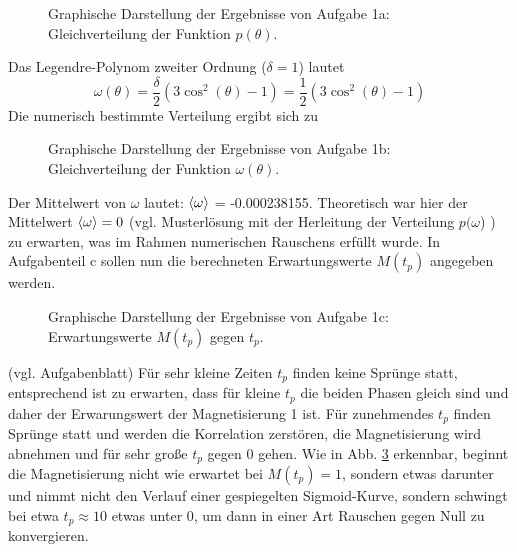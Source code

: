 \begin{landscape}
	\begin{figure}
		\caption{Graphische Darstellung der Ergebnisse von Aufgabe 1a: Gleichverteilung der Funktion $p(\theta)$.}
		\label{fig:1a}
	\end{figure}
\end{landscape}
Das Legendre-Polynom zweiter Ordnung ($\delta = 1$) lautet
\begin{equation}
	\omega(\theta) = \frac{\delta}{2} (3\cos^2(\theta)-1) = \frac{1}{2} (3\cos^2(\theta)-1)
\end{equation}
Die numerisch bestimmte Verteilung ergibt sich zu
\begin{landscape}
	\begin{figure}
		\caption{Graphische Darstellung der Ergebnisse von Aufgabe 1b: Gleichverteilung der Funktion $\omega(\theta)$.}
		\label{fig:1b}
	\end{figure}
\end{landscape}
Der Mittelwert von $\omega$ lautet: $\braket{\omega}$ = -0.000238155. Theoretisch war hier der Mittelwert $\braket{\omega} = 0$ (vgl. Musterlösung mit der Herleitung der Verteilung $p(\omega$) ) zu erwarten, was im Rahmen numerischen Rauschens erfüllt wurde.
In Aufgabenteil c sollen nun die berechneten Erwartungswerte $M(t_p)$ angegeben werden.
\begin{landscape}
	\begin{figure}
		\caption{Graphische Darstellung der Ergebnisse von Aufgabe 1c: Erwartungswerte $M(t_p)$ gegen $t_p$.}
		\label{fig:1c}
	\end{figure}
\end{landscape}
(vgl. Aufgabenblatt) Für sehr kleine Zeiten $t_p$ finden keine Sprünge statt, entsprechend ist zu erwarten,
dass für kleine $t_p$ die beiden Phasen gleich sind und daher der Erwarungswert der Magnetisierung 1 ist. Für zunehmendes $t_p$ finden Sprünge statt und werden die Korrelation zerstören, die Magnetisierung wird abnehmen und für sehr große $t_p$ gegen 0 gehen. Wie in Abb. \ref{fig:1c} erkennbar, beginnt die Magnetisierung nicht wie erwartet bei $M(t_p) = 1$, sondern etwas darunter und nimmt nicht den Verlauf einer gespiegelten Sigmoid-Kurve, sondern schwingt bei etwa $t_p \approx 10$ etwas unter 0, um dann in einer Art Rauschen gegen Null zu konvergieren.
